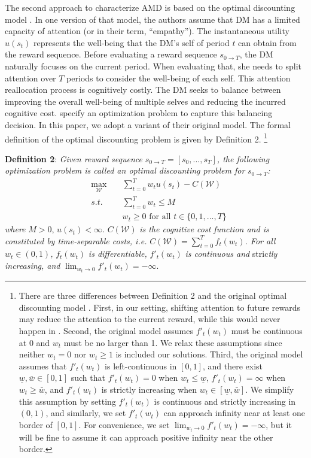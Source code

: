 \documentclass[
  12pt,
]{article}
\begin{document}
The second approach to characterize AMD is based on the optimal
discounting model \citep{noor2022optimal,noor2024constrained}. In one
version of that model, the authors assume that DM has a limited capacity
of attention (or in their term, ``empathy''). The instantaneous utility
\(u(s_t)\) represents the well-being that the DM's self of period \(t\)
can obtain from the reward sequence. Before evaluating a reward sequence
\(s_{0\rightarrow T}\), the DM naturally focuses on the current period.
When evaluating that, she needs to split attention over \(T\) periods to
consider the well-being of each self. This attention reallocation
process is cognitively costly. The DM seeks to balance between improving
the overall well-being of multiple selves and reducing the incurred
cognitive cost. \citet{noor2022optimal,noor2024constrained} specify an
optimization problem to capture this balancing decision. In this paper,
we adopt a variant of their original model. The formal definition of the
optimal discounting problem is given by Definition 2. \footnote{There
  are three differences between Definition 2 and the original optimal
  discounting model \citep{noor2022optimal,noor2024constrained}. First,
  in our setting, shifting attention to future rewards may reduce the
  attention to the current reward, while this would never happen in
  \citet{noor2022optimal,noor2024constrained}. Second, the original
  model assumes \(f'_t(w_t)\) must be continuous at 0 and \(w_t\) must
  be no larger than 1. We relax these assumptions since neither
  \(w_t=0\) nor \(w_t\geq1\) is included our solutions. Third, the
  original model assumes that \(f'_t(w_t)\) is left-continuous in
  \([0,1]\), and there exist \(\underline{w},\bar{w}\in[0,1]\) such that
  \(f'_t(w_t)=0\) when \(w_t\leq\underline{w}\), \(f'_t(w_t)=\infty\)
  when \(w_t\geq\bar{w}\), and \(f'_t(w_t)\) is strictly increasing when
  \(w_t \in [\underline{w},\bar{w}]\). We simplify this assumption by
  setting \(f'_t(w_t)\) is continuous and strictly increasing in
  \((0,1)\), and similarly, we set \(f'_t(w_t)\) can approach infinity
  near at least one border of \([0,1]\). For convenience, we set
  \(\lim_{w_t\rightarrow 0} f'_t(w_t)=-\infty\), but it will be fine to
  assume it can approach positive infinity near the other border.}

\noindent \textbf{Definition 2}: \emph{Given reward sequence}
\(s_{0\rightarrow T}=[s_0,...,s_T]\)\emph{, the following optimization
problem is called an optimal discounting problem for}
\(s_{0\rightarrow T}\)\emph{:}\[\tag{3}
\begin{aligned}
&\max_{\mathcal{W}}\;&&\sum_{t=0}^T w_tu(s_t) - C(\mathcal{W}) \\
&s.t.\; &&\sum_{t=0}^Tw_t \leq M \\
&&& w_t \geq 0 \text{ for all } t\in \{0,1,...,T\}
\end{aligned}
\]\emph{where} \(M>0\), \(u(s_t)<\infty\). \(C(\mathcal{W})\) \emph{is
the cognitive cost function and is constituted by time-separable costs,
i.e.} \(C(\mathcal{W})=\sum_{t=0}^Tf_t(w_t)\)\emph{. For all}
\(w_t\in(0,1)\)\emph{,} \(f_t(w_t)\) \emph{is differentiable,}
\(f'_t(w_t)\) \emph{is continuous and} stric\emph{tly increasing, and}
\(\lim_{w_t\rightarrow 0} f'_t(w_t)=-\infty\).
\end{document}
